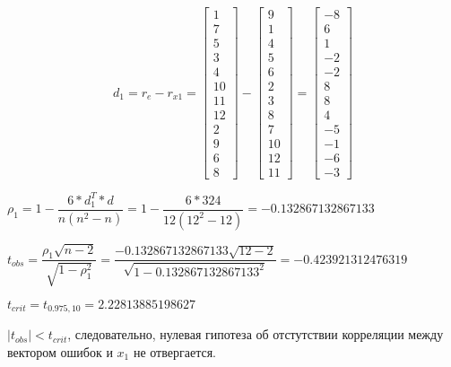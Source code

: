 \documentclass[12pt,a4paper, oneside]{extreport}
\begin{document}
\begin{equation}\label{key}
d_1 = r_e-r_{x1}  =  \begin{bmatrix} 
1 \\ 7 \\ 5 \\ 3 \\ 4 \\ 10 \\ 11 \\ 12 \\ 2 \\ 9 \\ 6 \\ 8\end{bmatrix} -  \begin{bmatrix} 
9 \\ 1 \\ 4 \\ 5 \\ 6 \\ 2 \\ 3 \\ 8 \\ 7 \\ 10 \\ 12 \\ 11\end{bmatrix}=  \begin{bmatrix} 
-8 \\ 6 \\ 1 \\ -2 \\ -2 \\ 8 \\ 8 \\ 4 \\ -5 \\ -1 \\ -6 \\ -3\end{bmatrix}
\end{equation}

$\rho_1 = 1 -\dfrac{6*d^T_1*d}{n(n^2-n)} = 1 -\dfrac{6*324}{12(12^2-12)} = -0.132867132867133 $

$t_{obs} = \dfrac{\rho_1 \sqrt{n-2} }{\sqrt{1-\rho^2_1} } = \dfrac{-0.132867132867133 \sqrt{12-2} }{\sqrt{1-0.132867132867133^2} } = -0.423921312476319 $

$t_{crit}  = t_{0.975, 10} = 2.22813885198627$

$|t_{obs}| < t_{crit} $, следовательно, нулевая гипотеза об отстутствии корреляции между вектором ошибок и $x_1$ не отвергается.   
 
\end{document}
